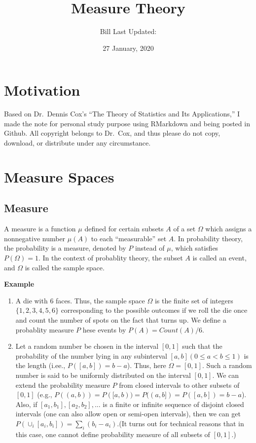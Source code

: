 \documentclass[]{book}
\title{Measure Theory}
\author{Bill Last Updated:}
\date{27 January, 2020}
\begin{document}
\maketitle

{
\setcounter{tocdepth}{1}
\tableofcontents
}
\hypertarget{my-section}{%
\chapter*{Motivation}\label{my-section}}

Based on Dr.~Dennis Cox's ``The Theory of Statistics and Its Applications,'' I made the note for personal study purpose using RMarkdown and being posted in Github. All copyright belongs to Dr.~Cox, and thus please do not copy, download, or distribute under any circumstance.

\hypertarget{measure-spaces}{%
\chapter{Measure Spaces}\label{measure-spaces}}

\hypertarget{measure}{%
\section{Measure}\label{measure}}

A measure is a function \(\mu\) defined for certain subsets \(A\) of a set \(\Omega\) which assigns a nonnegative number \(\mu(A)\) to each ``measurable'' set \(A\). In probability theory, the probability is a measure, denoted by \(P\) instead of \(\mu\), which satisfies \(P(\Omega)=1\). In the context of probablity theory, the subset \(A\) is called an event, and \(\Omega\) is called the sample space.

\textbf{Example}

\begin{enumerate}
\def\labelenumi{(\arabic{enumi})}
\item
  A die with 6 faces. Thus, the sample space \(\Omega\) is the finite set of integers \(\{1, 2, 3, 4, 5, 6\}\) corresponding to the possible outcomes if we roll the die once and count the number of spots on the fact that turns up. We define a probablity measure \(P\) hese events by \(P(A)=Count(A)/6\).
\item
  Let a random number be chosen in the interval \([0,1]\) such that the probability of the number lying in any subinterval \([a,b] (0 \leq a < b \leq 1)\) is the length (i.ee., \(P([a,b])=b-a\)). Thus, here \(\Omega=[0,1]\). Such a random number is said to be uniformly distributed on the interval \([0,1]\). We can extend the probability measure \(P\) from closed intervals to other subsets of \([0,1]\) (e.g., \(P((a,b))=P([a,b))=P((a,b])=P([a,b])=b-a\)). Also, if \([a_1,b_1],[a_2,b_2],...\) is a finite or infinite sequence of disjoint closed intervals (one can also allow open or semi-open intervals), then we can get \(P(\cup_i[a_i,b_i])=\sum_i(b_i-a_i)\).(It turns out for technical reasons that in this case, one cannot define probability measure of all subsets of \([0,1]\).)
\end{enumerate}
\end{document}
